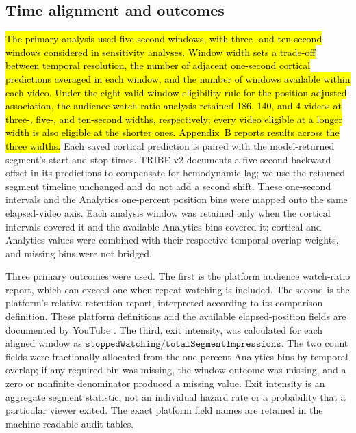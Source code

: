 \documentclass{ieeeaccess}
\newcommand{\rev}[1]{\hl{#1}}
\newcommand{\rev}[1]{#1}
\begin{document}
\subsection{Time alignment and outcomes}
\rev{The primary analysis used five-second windows, with three- and ten-second windows considered in sensitivity analyses. Window width sets a trade-off between temporal resolution, the number of adjacent one-second cortical predictions averaged in each window, and the number of windows available within each video. Under the eight-valid-window eligibility rule for the position-adjusted association, the audience-watch-ratio analysis retained 186, 140, and 4 videos at three-, five-, and ten-second widths, respectively; every video eligible at a longer width is also eligible at the shorter ones. Appendix~B reports results across the three widths.} Each saved cortical prediction is paired with the model-returned segment's start and stop times. TRIBE v2 documents a five-second backward offset in its predictions to compensate for hemodynamic lag; we use the returned segment timeline unchanged and do not add a second shift. These one-second intervals and the Analytics one-percent position bins were mapped onto the same elapsed-video axis. Each analysis window was retained only when the cortical intervals covered it and the available Analytics bins covered it; cortical and Analytics values were combined with their respective temporal-overlap weights, and missing bins were not bridged.

Three primary outcomes were used. The first is the platform audience watch-ratio report, which can exceed one when repeat watching is included. The second is the platform's relative-retention report, interpreted according to its comparison definition. These platform definitions and the available elapsed-position fields are documented by YouTube \cite{youtubeRetentionAPI}. The third, exit intensity, was calculated for each aligned window as \(\texttt{stoppedWatching}/\texttt{totalSegmentImpressions}\). The two count fields were fractionally allocated from the one-percent Analytics bins by temporal overlap; if any required bin was missing, the window outcome was missing, and a zero or nonfinite denominator produced a missing value. Exit intensity is an aggregate segment statistic, not an individual hazard rate or a probability that a particular viewer exited. The exact platform field names are retained in the machine-readable audit tables.
\end{document}
